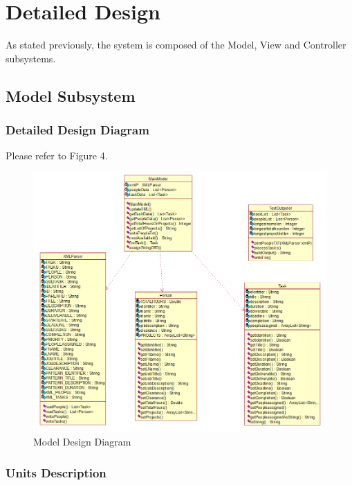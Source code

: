 \documentclass[12pt]{article}
\begin{document}
\section{Detailed Design} \label{sec:detail}

As stated previously, the system is composed of the Model, View and Controller subsystems.

\subsection{Model Subsystem}

\subsubsection{Detailed Design Diagram}

Please refer to Figure 4.
\begin{figure}[htbp]
\begin{center} \includegraphics[scale=.7]{Diagrams/model_diagram.png} \end{center}
\caption{Model Design Diagram}
\label{fig:model-diagram}
\end{figure}

\subsubsection{Units Description}
\end{document}
